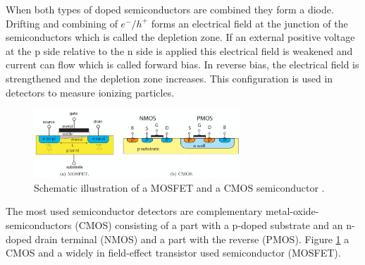 When both types of doped semiconductors are combined they form a diode.
Drifting and combining of $e^-/h^+$ forms an electrical field at the junction of the semiconductors which is called the depletion zone.
If an external positive voltage at the p side relative to the n side is applied this electrical field is weakened and current can flow which is called forward bias.
In reverse bias, the electrical field is strengthened and the depletion zone increases. 
This configuration is used in detectors to measure ionizing particles. %
\begin{figure}[H]
    \centering
    \includegraphics[width=0.69\textwidth]{figs/MOS.png}
    \caption{Schematic illustration of a MOSFET and a CMOS semiconductor \cite{KolanoskiWermes}.}
    \label{fig:MOStransition}
\end{figure}
The most used semiconductor detectors are complementary metal-oxide-semiconductors (CMOS) consisting of a part with a p-doped substrate and an n-doped drain terminal (NMOS) and a part with the reverse (PMOS).
Figure \ref{fig:MOStransition} a CMOS and a widely in field-effect transistor used semiconductor (MOSFET).

